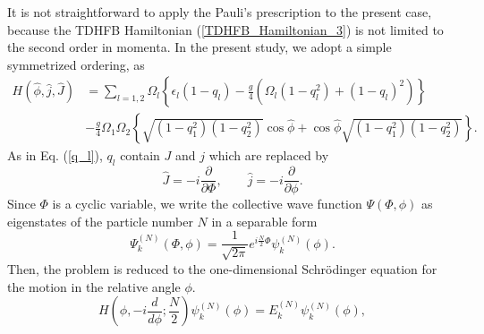 \documentclass[%
superscriptaddress,
preprint,
showpacs,
nofootinbib,
amsmath,amssymb,
aps,
prc,
floatfix ]%
{revtex4-1}
\begin{document}
It is not straightforward to apply the Pauli's prescription
to the present case, 
because the TDHFB Hamiltonian (\ref{TDHFB_Hamiltonian_3})
is not limited to the second order in momenta.
In the present study, 
we adopt a simple symmetrized ordering, as
\begin{align}
	H(\hat{\phi},\hat{j},\hat{J})
	&= \sum_{l=1,2} \Omega_l \left\{ \epsilon_l (1-q_l) 
	- \frac{g}{4} (\Omega_l(1-q_l^2)+(1-q_l)^2) \right\}
	\nonumber \\
	&- \frac{g}{4}\Omega_{1}\Omega_{2}
	\left\{ \sqrt{(1-q_{1}^2)(1-q_{2}^2)}\cos{\hat{\phi}}
	+ \cos{\hat{\phi}}\sqrt{(1-q_{1}^2)(1-q_{2}^2)} \right\} .
\label{canonical_quantized_H}
\end{align}
As in Eq. (\ref{q_l}), $q_l$ contain $J$ and $j$ which
are replaced by
\begin{equation}
	\hat{J} = -i\frac{\partial}{\partial\Phi},\quad\quad
	\hat{j} = -i\frac{\partial}{\partial\phi} .
\end{equation}
Since $\Phi$ is a cyclic variable, 
we write the collective wave function $\Psi(\Phi,\phi)$ as eigenstates
of the particle number $N$ in a separable form
\begin{equation}
  \Psi_k^{(N)}(\Phi,\phi) = 
	\frac{1}{\sqrt{2\pi}}e^{i\frac{N}{2}\Phi}\psi_k^{(N)}(\phi) .
\end{equation}
Then, the problem is reduced to the one-dimensional Schr\"{o}dinger
equation for the motion in the relative angle $\phi$.
\begin{equation}
	H\left( \phi,-i\frac{d}{d\phi};\frac{N}{2} \right)
	\psi_k^{(N)}(\phi) = E_k^{(N)}\psi_k^{(N)}(\phi),
	\label{Schroedinger_eq}
\end{equation}
\end{document}
